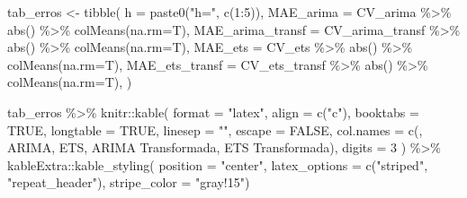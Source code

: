 \documentclass[
  letterpaper,
  DIV=11,
  numbers=noendperiod]{scrartcl}
\newenvironment{Shaded}{\begin{snugshade}}{\end{snugshade}}
\newcommand{\AttributeTok}[1]{\textcolor[rgb]{0.40,0.45,0.13}{#1}}
\newcommand{\ConstantTok}[1]{\textcolor[rgb]{0.56,0.35,0.01}{#1}}
\newcommand{\DecValTok}[1]{\textcolor[rgb]{0.68,0.00,0.00}{#1}}
\newcommand{\FunctionTok}[1]{\textcolor[rgb]{0.28,0.35,0.67}{#1}}
\newcommand{\NormalTok}[1]{\textcolor[rgb]{0.00,0.23,0.31}{#1}}
\newcommand{\OtherTok}[1]{\textcolor[rgb]{0.00,0.23,0.31}{#1}}
\newcommand{\SpecialCharTok}[1]{\textcolor[rgb]{0.37,0.37,0.37}{#1}}
\newcommand{\StringTok}[1]{\textcolor[rgb]{0.13,0.47,0.30}{#1}}
\begin{document}
\begin{Shaded}
\begin{Highlighting}[]
\NormalTok{tab\_erros }\OtherTok{\textless{}{-}} \FunctionTok{tibble}\NormalTok{(}
  \AttributeTok{h =} \FunctionTok{paste0}\NormalTok{(}\StringTok{"h="}\NormalTok{, }\FunctionTok{c}\NormalTok{(}\DecValTok{1}\SpecialCharTok{:}\DecValTok{5}\NormalTok{)),}
  \AttributeTok{MAE\_arima =}\NormalTok{ CV\_arima }\SpecialCharTok{\%\textgreater{}\%} \FunctionTok{abs}\NormalTok{() }\SpecialCharTok{\%\textgreater{}\%} \FunctionTok{colMeans}\NormalTok{(}\AttributeTok{na.rm=}\NormalTok{T),}
  \AttributeTok{MAE\_arima\_transf =}\NormalTok{  CV\_arima\_transf }\SpecialCharTok{\%\textgreater{}\%} \FunctionTok{abs}\NormalTok{() }\SpecialCharTok{\%\textgreater{}\%} \FunctionTok{colMeans}\NormalTok{(}\AttributeTok{na.rm=}\NormalTok{T),}
  \AttributeTok{MAE\_ets =}\NormalTok{  CV\_ets }\SpecialCharTok{\%\textgreater{}\%} \FunctionTok{abs}\NormalTok{() }\SpecialCharTok{\%\textgreater{}\%} \FunctionTok{colMeans}\NormalTok{(}\AttributeTok{na.rm=}\NormalTok{T),}
  \AttributeTok{MAE\_ets\_transf =}\NormalTok{  CV\_ets\_transf }\SpecialCharTok{\%\textgreater{}\%} \FunctionTok{abs}\NormalTok{() }\SpecialCharTok{\%\textgreater{}\%} \FunctionTok{colMeans}\NormalTok{(}\AttributeTok{na.rm=}\NormalTok{T),}
\NormalTok{)}


\NormalTok{tab\_erros }\SpecialCharTok{\%\textgreater{}\%}
\NormalTok{  knitr}\SpecialCharTok{::}\FunctionTok{kable}\NormalTok{(}
    \AttributeTok{format =} \StringTok{"latex"}\NormalTok{,}
    \AttributeTok{align =} \FunctionTok{c}\NormalTok{(}\StringTok{"c"}\NormalTok{),}
    \AttributeTok{booktabs =} \ConstantTok{TRUE}\NormalTok{,}
    \AttributeTok{longtable =} \ConstantTok{TRUE}\NormalTok{,}
    \AttributeTok{linesep =} \StringTok{""}\NormalTok{,}
    \AttributeTok{escape =} \ConstantTok{FALSE}\NormalTok{,}
    \AttributeTok{col.names =} \FunctionTok{c}\NormalTok{(}\StringTok{\textquotesingle{}\textquotesingle{}}\NormalTok{, }\StringTok{\textquotesingle{}ARIMA\textquotesingle{}}\NormalTok{, }\StringTok{\textquotesingle{}ETS\textquotesingle{}}\NormalTok{, }\StringTok{\textquotesingle{}ARIMA Transformada\textquotesingle{}}\NormalTok{, }\StringTok{\textquotesingle{}ETS Transformada\textquotesingle{}}\NormalTok{),}
    \AttributeTok{digits =} \DecValTok{3}
\NormalTok{    ) }\SpecialCharTok{\%\textgreater{}\%}
\NormalTok{  kableExtra}\SpecialCharTok{::}\FunctionTok{kable\_styling}\NormalTok{(}
      \AttributeTok{position =} \StringTok{"center"}\NormalTok{,}
      \AttributeTok{latex\_options =} \FunctionTok{c}\NormalTok{(}\StringTok{"striped"}\NormalTok{, }\StringTok{"repeat\_header"}\NormalTok{),}
      \AttributeTok{stripe\_color =} \StringTok{"gray!15"}\NormalTok{)}



\end{Highlighting}
\end{Shaded}
\end{document}
